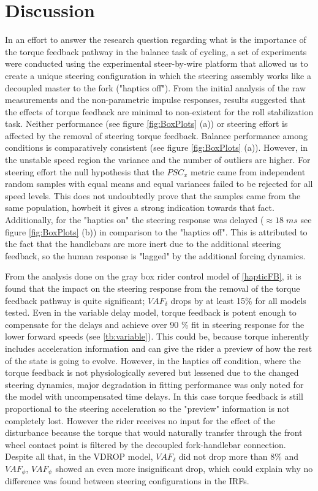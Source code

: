 \chapter{Discussion}
 
In an effort to answer the research question regarding what is the importance of the torque feedback pathway in the balance task of cycling, a set of experiments were conducted using the experimental steer-by-wire platform that allowed us to create a unique steering configuration in which the steering assembly works like a decoupled master to the fork ("haptics off"). From the initial analysis of the raw measurements and the non-parametric impulse responses, results  suggested  that the effects of torque feedback are minimal to non-existent for the roll stabilization task. Neither performance (see figure \ref{fig:BoxPlots} (a)) or steering effort is affected by the removal of  steering torque feedback. Balance performance among conditions is comparatively consistent  (see figure \ref{fig:BoxPlots} (a)). However, in the unstable speed region the variance and the number of outliers are higher. For steering effort the null hypothesis that the $\mathit{PSC}_x$ metric came from independent random samples with equal means and equal variances failed to be rejected for all speed levels. This does not undoubtedly prove that the samples came from the same population, howbeit it gives a strong indication towards that fact. Additionally, for the "haptics  on"  the steering response was delayed (\(\approx 18\; \si{ms}\) see figure \ref{fig:BoxPlots} (b)) in comparison to the "haptics off". This is attributed to the fact that the handlebars are more inert due to the additional steering feedback, so the human response is "lagged" by the additional forcing dynamics.
 
From the analysis done on the gray box rider control model of \cref{hapticFB}, it is found that  the impact on the steering response from the removal of the torque feedback pathway is quite significant; \ensuremath{\mathit{VAF}_\delta} drops by at least 15\% for all models tested. Even in the variable delay model, torque feedback is potent enough to compensate for the delays and achieve over 90 \% fit in steering response for the lower forward speeds (see \cref{tb:variable}). This could be, because torque inherently includes acceleration information and can give  the rider a preview of how the rest of the state is going to evolve. However, in the haptics off condition, where the torque feedback is not physiologically severed but lessened due to the changed steering dynamics, major  degradation in fitting performance was only noted for the model with uncompensated time delays. In this case torque feedback is still proportional to the steering acceleration so the "preview" information is not completely lost. However the rider receives no input for the effect of the disturbance because the torque that would naturally transfer through the front wheel contact point is filtered by the decoupled fork-handlebar connection.  Despite all that, in the VDROP model, \ensuremath{VAF_\delta} did not drop more than 8\% and \ensuremath{VAF_\phi}, \ensuremath{VAF_\psi} showed an even more insignificant drop, which could explain why no difference was found between steering configurations in the IRFs. 
 
